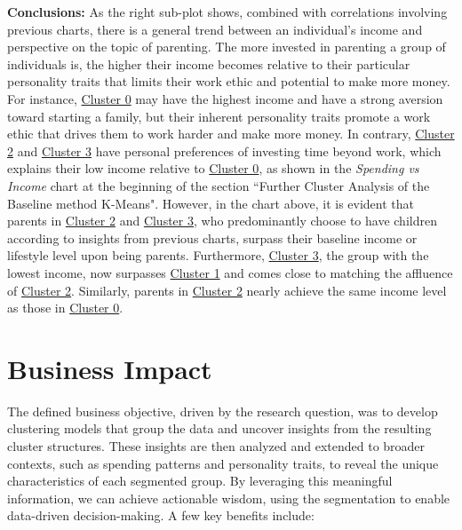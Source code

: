 \documentclass[11pt]{article}
\begin{document}
\vspace{1\baselineskip}
\textbf{Conclusions:} As the right sub-plot shows, combined with correlations involving previous charts, there is a general trend between an individual’s income and perspective on the topic of parenting. The more invested in parenting a group of individuals is, the higher their income becomes relative to their particular personality traits that limits their work ethic and potential to make more money. For instance, \uline{\textcolor[HTML]{BF9000}{Cluster 0}} may have the highest income and have a strong aversion toward starting a family, but their inherent personality traits promote a work ethic that drives them to work harder and make more money. In contrary, \uline{\textcolor[HTML]{38761D}{Cluster 2}} and \uline{\textcolor[HTML]{674EA7}{Cluster 3}} have personal preferences of investing time beyond work, which explains their low income relative to \uline{\textcolor[HTML]{BF9000}{Cluster 0}}, as shown in the \textit{Spending vs Income} chart at the beginning of the section ``Further Cluster Analysis of the Baseline method K-Means". However, in the chart above, it is evident that parents in \uline{\textcolor[HTML]{38761D}{Cluster 2}} and \uline{\textcolor[HTML]{674EA7}{Cluster 3}}, who predominantly choose to have children according to insights from previous charts, surpass their baseline income or lifestyle level upon being parents. Furthermore, \uline{\textcolor[HTML]{674EA7}{Cluster 3}}, the group with the lowest income, now surpasses \uline{\textcolor[HTML]{0B5394}{Cluster 1}} and comes close to matching the affluence of \uline{\textcolor[HTML]{38761D}{Cluster 2}}. Similarly, parents in \uline{\textcolor[HTML]{38761D}{Cluster 2}} nearly achieve the same income level as those in \uline{\textcolor[HTML]{BF9000}{Cluster 0}}.

\vspace{1\baselineskip}
\section{Business Impact}

The defined business objective, driven by the research question, was to develop clustering models that group the data and uncover insights from the resulting cluster structures. These insights are then analyzed and extended to broader contexts, such as spending patterns and personality traits, to reveal the unique characteristics of each segmented group. By leveraging this meaningful information, we can achieve actionable wisdom, using the segmentation to enable data-driven decision-making. A few key benefits include:
\end{document}
